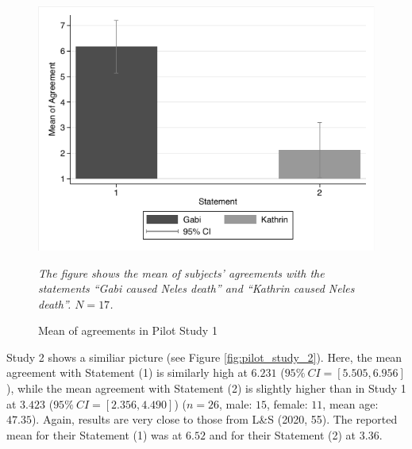 \documentclass[egregdoesnotlikesansseriftitles,12pt]{scrartcl}
\begin{document}
\begin{figure}[H]
   \centering
   \includegraphics[scale=0.8]{figures/pilot_study_1.pdf}
   \begin{minipage}{0.9\linewidth}
   \footnotesize
   \emph{The figure shows the mean of subjects' agreements with the statements ``Gabi caused Neles death'' and ``Kathrin caused Neles death''. $N=17$.}
   \end{minipage}
   \caption{Mean of agreements in Pilot Study 1}
   \label{fig:pilot_study_1}
\end{figure}

\noindent Study 2 shows a similiar picture (see Figure \ref{fig:pilot_study_2}). Here, the mean agreement with Statement (1) is similarly high at $6.231$ ($95\%~CI=[5.505,6.956]$), while the mean agreement with Statement (2) is slightly higher than in Study 1 at $3.423$ ($95\%~CI=[2.356,4.490]$) ($n=26$, male: $15$, female: $11$, mean age: $47.35$). Again, results are very close to those from L\&S (2020, 55). The reported mean for their Statement (1) was at $6.52$ and for their Statement (2) at $3.36$.
\end{document}
